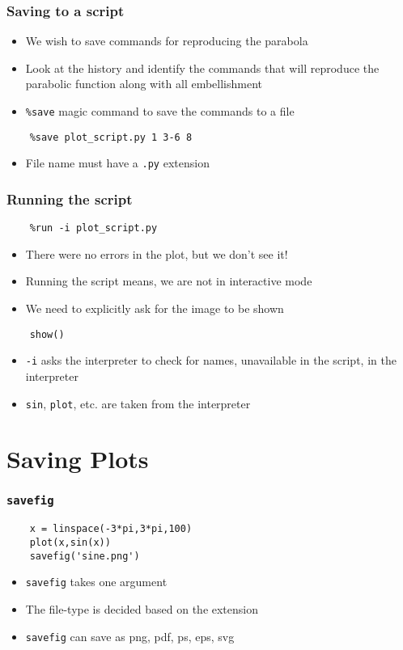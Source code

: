 \begin{frame}[fragile]
  \frametitle{Saving to a script}
  \begin{itemize}
  \item We wish to save commands for reproducing the parabola
  \item Look at the history and identify the commands that will
    reproduce the parabolic function along with all embellishment
  \item \texttt{\%save} magic command to save the commands to a file
  \end{itemize}
  \begin{lstlisting}
    %save plot_script.py 1 3-6 8
  \end{lstlisting}
  \begin{itemize}
  \item File name must have a \texttt{.py} extension
  \end{itemize}
\end{frame}

\begin{frame}[fragile]
  \frametitle{Running the script}
  \begin{lstlisting}
    %run -i plot_script.py
  \end{lstlisting}
  \begin{itemize}
  \item There were no errors in the plot, but we don't see it!
  \item Running the script means, we are not in interactive mode
  \item We need to explicitly ask for the image to be shown
  \end{itemize}
  \begin{lstlisting}
    show()
  \end{lstlisting}
  \begin{itemize}
  \item \texttt{-i} asks the interpreter to check for names,
    unavailable in the script, in the interpreter
  \item \texttt{sin}, \texttt{plot}, etc. are taken from the
    interpreter
  \end{itemize}
\end{frame}

\section{Saving Plots}

\begin{frame}[fragile]
  \frametitle{\texttt{savefig}}
  \begin{lstlisting}
    x = linspace(-3*pi,3*pi,100)
    plot(x,sin(x))
    savefig('sine.png')
  \end{lstlisting}
  \begin{itemize}
  \item \texttt{savefig} takes one argument
  \item The file-type is decided based on the extension
  \item \texttt{savefig} can save as png, pdf, ps, eps, svg
  \end{itemize}
\end{frame}

